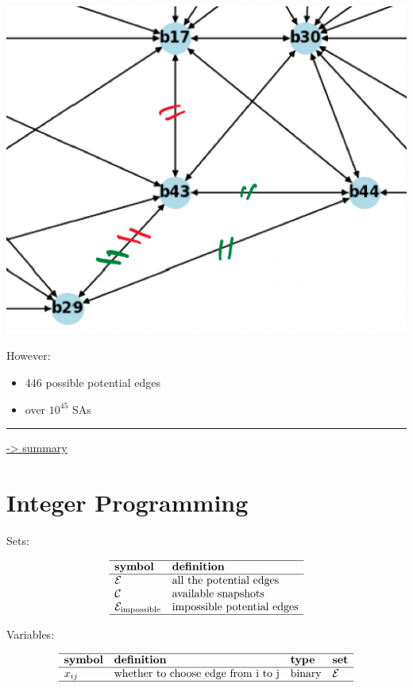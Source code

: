 \documentclass[
]{book}
\providecommand{\tightlist}{%
  \setlength{\itemsep}{0pt}\setlength{\parskip}{0pt}}
\begin{document}
\begin{center}\includegraphics[width=0.6\linewidth]{Pictures/overlapGeth} \end{center}

However:

\begin{itemize}
\tightlist
\item
  446 possible potential edges
\item
  over \(10^{45}\) SAs
\end{itemize}

\begin{center}\rule{0.5\linewidth}{0.5pt}\end{center}

\protect\hyperlink{summary}{-\textgreater{} summary}

\hypertarget{IP}{%
\section{Integer Programming}\label{IP}}

Sets:

\[
\begin{array}{ll}
  \hline
  \textbf{symbol} & \textbf{definition} \\
  \hline
  \mathcal{E}
  & \text{all the potential edges} \\
  \mathcal{C}
  & \text{available snapshots} \\
  \mathcal{E}_\text{impossible}
  & \text{impossible potential edges} \\
  \hline
\end{array}
\]

Variables:

\[
\begin{array}{llll}
  \hline
  \textbf{symbol} & \textbf{definition} & \textbf{type} & \textbf{set} \\
  \hline
  x_{i j} & \text{whether to choose edge from i to j}
  & \text{binary} & \mathcal{E} \\
  \hline
\end{array}
\]
\end{document}
